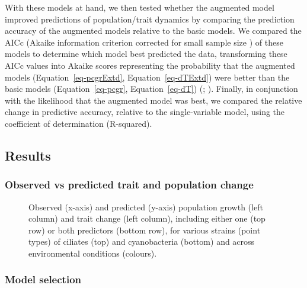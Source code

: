 \documentclass[
  letterpaper,
  DIV=11,
  numbers=noendperiod]{scrartcl}
\begin{document}
With these models at hand, we then tested whether the augmented model
improved predictions of population/trait dynamics by comparing the
prediction accuracy of the augmented models relative to the basic
models. We compared the AICc (Akaike information criterion corrected for
small sample size )
of these models to determine which model best predicted the data,
transforming these AICc values into Akaike scores representing the
probability that the augmented models (Equation~\ref{eq-pcgrExtd},
Equation~\ref{eq-dTExtd}) were better than the basic models
(Equation~\ref{eq-pcgr}, Equation~\ref{eq-dT})
(;
). Finally, in
conjunction with the likelihood that the augmented model was best, we
compared the relative change in predictive accuracy, relative to the
single-variable model, using the coefficient of determination
(R-squared).

\subsection{Results}\label{sec-DAE_results}

\subsubsection{Observed vs predicted trait and population
change}\label{observed-vs-predicted-trait-and-population-change}

\begin{figure}


\caption{\label{fig-growth-dtrait}Observed (x-axis) and predicted
(y-axis) population growth (left column) and trait change (left column),
including either one (top row) or both predictors (bottom row), for
various strains (point types) of ciliates (top) and cyanobacteria
(bottom) and across environmental conditions (colours).}

\end{figure}%

\subsubsection{Model selection}\label{model-selection}
\end{document}
